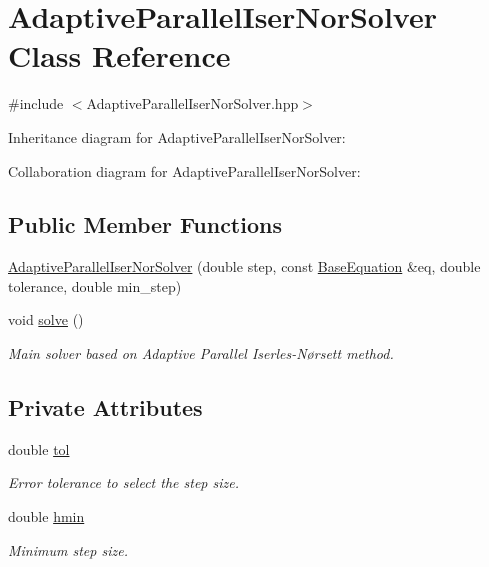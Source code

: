 \hypertarget{classAdaptiveParallelIserNorSolver}{}\section{Adaptive\+Parallel\+Iser\+Nor\+Solver Class Reference}
\label{classAdaptiveParallelIserNorSolver}


{\ttfamily \#include $<$Adaptive\+Parallel\+Iser\+Nor\+Solver.\+hpp$>$}



Inheritance diagram for Adaptive\+Parallel\+Iser\+Nor\+Solver\+:


Collaboration diagram for Adaptive\+Parallel\+Iser\+Nor\+Solver\+:
\subsection*{Public Member Functions}
\begin{DoxyCompactItemize}
\item 
\hyperlink{classAdaptiveParallelIserNorSolver_ae3c79a6e2902f6c8c0550d77f08267ba}{Adaptive\+Parallel\+Iser\+Nor\+Solver} (double step, const \hyperlink{classBaseEquation}{Base\+Equation} \&eq, double tolerance, double min\+\_\+step)
\item 
void \hyperlink{classAdaptiveParallelIserNorSolver_a60b05ac78168b6e7dfc5b414d0fefdff}{solve} ()
\begin{DoxyCompactList}\small\item\em Main solver based on Adaptive Parallel Iserles-\/\+Nørsett method. \end{DoxyCompactList}\end{DoxyCompactItemize}
\subsection*{Private Attributes}
\begin{DoxyCompactItemize}
\item 
double \hyperlink{classAdaptiveParallelIserNorSolver_adfb74677c32e6d7d0e616566111a662d}{tol}
\begin{DoxyCompactList}\small\item\em Error tolerance to select the step size. \end{DoxyCompactList}\item 
double \hyperlink{classAdaptiveParallelIserNorSolver_a0c7b56485dd75ab0a923dea7bdeabca0}{hmin}
\begin{DoxyCompactList}\small\item\em Minimum step size. \end{DoxyCompactList}\end{DoxyCompactItemize}
